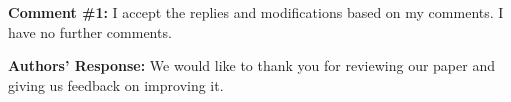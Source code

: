 \begin{center}
\end{center}

\vspace{0.5cm}


\begin{mdframed}[style=review] 
\textbf{Comment \#1:} I accept the replies and modifications based on my comments. I have no further comments.
\end{mdframed}

\textbf{Authors' Response:} 
We would like to thank you for reviewing our paper and giving us feedback on improving it.
\vspace{\baselineskip}

